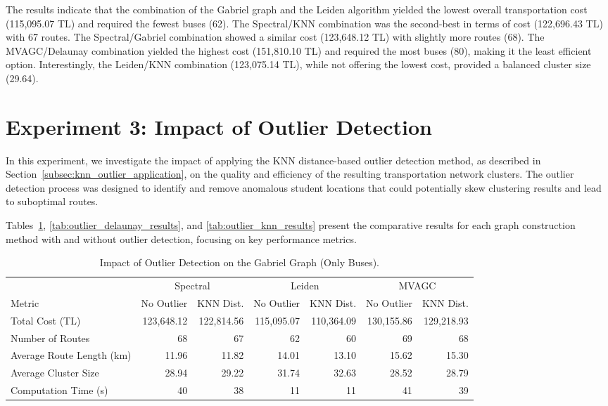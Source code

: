 The results indicate that the combination of the Gabriel graph and the Leiden algorithm yielded the lowest overall transportation cost (115,095.07 TL) and required the fewest buses (62). The Spectral/KNN combination was the second-best in terms of cost (122,696.43 TL) with 67 routes. The Spectral/Gabriel combination showed a similar cost (123,648.12 TL) with slightly more routes (68). The MVAGC/Delaunay combination yielded the highest cost (151,810.10 TL) and required the most buses (80), making it the least efficient option. Interestingly, the Leiden/KNN combination (123,075.14 TL), while not offering the lowest cost, provided a balanced cluster size (29.64).

\section{Experiment 3: Impact of Outlier Detection}
\label{sec:exp_outlier}

In this experiment, we investigate the impact of applying the KNN distance-based outlier detection method, as described in Section~\ref{subsec:knn_outlier_application}, on the quality and efficiency of the resulting transportation network clusters. The outlier detection process was designed to identify and remove anomalous student locations that could potentially skew clustering results and lead to suboptimal routes.


Tables~\ref{tab:outlier_gabriel_results}, \ref{tab:outlier_delaunay_results}, and \ref{tab:outlier_knn_results} present the comparative results for each graph construction method with and without outlier detection, focusing on key performance metrics.

\begin{table}[h]
\centering
\scriptsize{
\setlength{\tabcolsep}{4pt}
\begin{tabular}{lrrrrrr}
\toprule
& \multicolumn{2}{c}{Spectral} & \multicolumn{2}{c}{Leiden} & \multicolumn{2}{c}{MVAGC} \\
\cmidrule(lr){2-3} \cmidrule(lr){4-5} \cmidrule(lr){6-7}
Metric & No Outlier & KNN Dist. & No Outlier & KNN Dist. & No Outlier & KNN Dist. \\
\midrule
Total Cost (TL) & 123,648.12 & 122,814.56 & 115,095.07 & 110,364.09 & 130,155.86 & 129,218.93 \\
Number of Routes & 68 & 67 & 62 & 60 & 69 & 68 \\
Average Route Length (km) & 11.96 & 11.82 & 14.01 & 13.10 & 15.62 & 15.30 \\
Average Cluster Size & 28.94 & 29.22 & 31.74 & 32.63 & 28.52 & 28.79 \\
Computation Time (s) & 40 & 38 & 11 & 11 & 41 & 39 \\ 
\bottomrule
\end{tabular}
}
\caption{Impact of Outlier Detection on the Gabriel Graph (Only Buses).}
\label{tab:outlier_gabriel_results}
\end{table}

